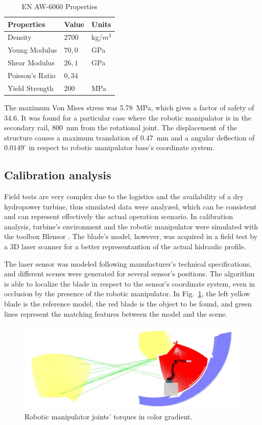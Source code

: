 \begin{table} [h!]
\centering
\begin{tabular}{|l|l|l|}
\hline
\textbf{Properties}   & \textbf{Value}   & \textbf{Units}	  \\ \hline
Density			       & $2700$           & kg/$m^3$          \\ \hline
Young Modulus		   & $70,0$           & GPa               \\ \hline
Shear Modulus		   & $26,1$           & GPa               \\ \hline
Poisson's Ratio		   & $0,34$           &                   \\ \hline
Yield Strength  	   & $200$            & MPa               \\ \hline
\end{tabular}
\caption{EN AW-6060 Properties}
\label{tab::prop_material}
\end{table}

The maximum Von Mises stress was 5.78~MPa, which gives a factor of safety of
34.6. It was found for a particular case where the robotic manipulator is in
the secondary rail, 800~mm from the rotational joint. The displacement of the
structure causes a maximum translation of 0.47~mm and a angular deflection of
$0.0149^{\circ}$ in respect to robotic manipulator base's coordinate system. 



\subsection{Calibration analysis}

Field tests are very complex due to the logistics and the availability of a dry
hydropower turbine, thus simulated data were analyzed, which can be consistent
and can represent effectively the actual operation scenario. In calibration
analysis, turbine's environment and the robotic manipulator were simulated with
the toolbox Blensor \cite{Gschwandtner11b}. The blade's model, however, was
acquired in a field test by a 3D laser scanner for a better representantion of
the actual hidraulic profile.

The laser sensor was modeled following manufacturer's technical
specifications, and different scenes were generated for several sensor's
positions. The algorithm is able to localize the blade in respect to the
sensor's coordinate system, even in occlusion by the presence of the robotic
manipulator. In Fig.~\ref{fig:calibration}, the left yellow blade is the
reference model, the red blade is the object to be found, and green lines
represent the matching features between the model and the scene.

\begin{figure}
	\centering
	\includegraphics[width=.95\columnwidth]{figs/results/sim_mh12_sp}
    \caption{Robotic manipulator joints' torques in color gradient.}
    \label{fig:calibration}
\end{figure}